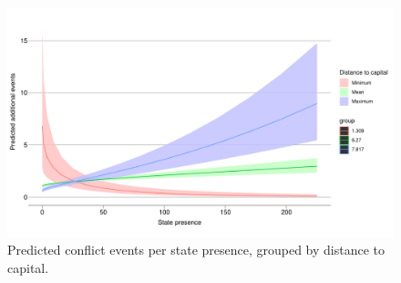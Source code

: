 \documentclass[12pt]{article}
\begin{document}








\begin{figure}[htpb]
	\centering
	\includegraphics[width=\linewidth]{"../R/Output/SBzinbplot.pdf"}
	\caption{Predicted conflict events per state presence, grouped by
	distance to capital.}
	\label{state_int}
\end{figure}
\end{document}
